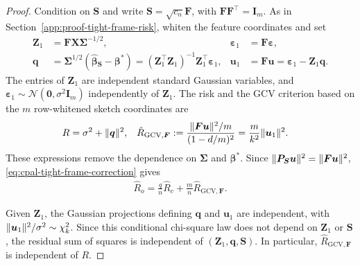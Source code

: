 \documentclass{article}
\theoremstyle{plain}
\theoremstyle{definition}
\theoremstyle{definition}
\newcommand{\boldzero}{\mathbf{0}}
\DeclarePairedDelimiter\norm{\lVert}{\rVert}
\def\mathbold{\boldsymbol}
\def\cal{\mathcal}
\def\bF{\mathbold{F}}\def\calF{{\cal F}}\def\scrF{{\mathscr F}}\def\Fhat{\widehat{F}}\def\Ftil{{\widetilde F}}
\def\bI{\mathbold{I}}\def\hbI{{\widehat{\bI}}}\def\tbI{{\widetilde{\bI}}}
\def\calN{{\cal N}}\def\scrN{{\mathscr N}}\def\Nhat{\widehat{N}}\def\Ntil{{\widetilde N}}\def\Nbar{{\overline N}}
\def\bP{\mathbold{P}}\def\hbP{{\widehat{\bP}}}\def\tbP{{\widetilde{\bP}}}
\def\bq{\mathbold{q}}\def\qhat{\widehat{q}}\def\qtil{\widetilde{q}}\def\qbar{{\overline q}}
\def\bS{\mathbold{S}}\def\hbS{{\widehat{\bS}}}\def\tbS{{\widetilde{\bS}}}
\def\bu{\mathbold{u}}\def\uhat{\widehat{u}}\def\util{\widetilde{u}}\def\ubar{{\overline u}}
\def\bX{\mathbold{X}}\def\hbX{{\widehat{\bX}}}\def\tbX{{\tilde{\bX}}}\def\bXbar{{\overline \bX}}
\def\bZ{\mathbold{Z}}\def\hbZ{{\widehat{\bZ}}}\def\tbZ{{\widetilde{\bZ}}}
\def\bbeta{\mathbold{\beta}}\def\betahat{\widehat{\beta}}\def\hbeta{\widehat{\beta}}
\def\hbbeta{\hat{\bbeta}{}}
\def\ep{\varepsilon}\def\eps{\epsilon}\def\veps{\varepsilon}
\def\bep{ {\mathbold{\ep} }}
\def\bSigma{\mathbold{\Sigma}}\def\hbSigma{{\widehat{\bSigma}}}
\newcommand{\GCV}{{\text{GCV}}}
\newcommand{\hR}{\hat{R}}
\begin{document}
\begin{proof}
Condition on $\bS$ and write $\bS=\sqrt{c_n}\bF$, with
$\bF\bF^\top=\bI_m$. As in
Section~\ref{app:proof-tight-frame-risk}, whiten the feature coordinates and set
\begin{align*}
    \bZ_1&=\bF\bX\bSigma^{-1/2},
    &\bep_1&=\bF\bep,\\
    \bq&=\bSigma^{1/2}(\hbbeta_{\bS}-\bbeta^*)
       =(\bZ_1^\top\bZ_1)^{-1}\bZ_1^\top\bep_1,
    &\bu_1&=\bF\bu=\bep_1-\bZ_1\bq.
\end{align*}
The entries of $\bZ_1$ are independent standard Gaussian variables, and
$\bep_1\sim\calN(\boldzero,\sigma^2\bI_m)$ independently of $\bZ_1$.
The risk and the GCV criterion based on the $m$ row-whitened sketch
coordinates are
\begin{align*}
    R&=\sigma^2+\norm{\bq}^2,
    &\hR_{\GCV,\bF}
    &:=\frac{\norm{\bF\bu}^2/m}{(1-d/m)^2}
      =\frac{m}{k^2}\norm{\bu_1}^2.
\end{align*}
These expressions remove the dependence on $\bSigma$ and $\bbeta^*$.
Since $\norm{\bP_{\bS}\bu}^2=\norm{\bF\bu}^2$,
\eqref{eq:cpal-tight-frame-correction} gives
\begin{align}
    \hR_o=\frac qn\widehat R_c+\frac mn\hR_{\GCV,\bF}.
    \label{eq:tight-frame-R-obs-pooled-decomposition}
\end{align}

Given $\bZ_1$, the Gaussian projections defining $\bq$ and
$\bu_1$ are independent, with
$\norm{\bu_1}^2/\sigma^2\sim\chi^2_k$. Since this conditional chi-square
law does not depend on $\bZ_1$ or $\bS$, the residual sum of squares is
independent of $(\bZ_1,\bq,\bS)$. In particular,
$\hR_{\GCV,\bF}$ is independent of $R$.


\end{proof}
\end{document}

